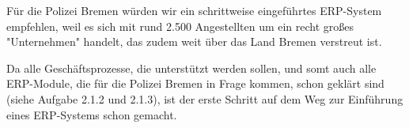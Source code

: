 \documentclass[12pt,utf8]{scrartcl}
\begin{document}
Für die Polizei Bremen würden wir ein schrittweise eingeführtes ERP-System empfehlen, weil es sich mit rund 2.500 Angestellten um ein recht großes "Unternehmen" handelt, das zudem weit über das Land Bremen verstreut ist\cite{PolizeiBremen}. 

Da alle Geschäftsprozesse, die unterstützt werden sollen, und somt auch alle ERP-Module, die für die Polizei Bremen in Frage kommen, schon geklärt sind (siehe Aufgabe 2.1.2 und 2.1.3), ist der erste Schritt auf dem Weg zur Einführung eines ERP-Systems schon gemacht. 

\newpage
\begin{flushleft}

\end{flushleft}
\end{document}
